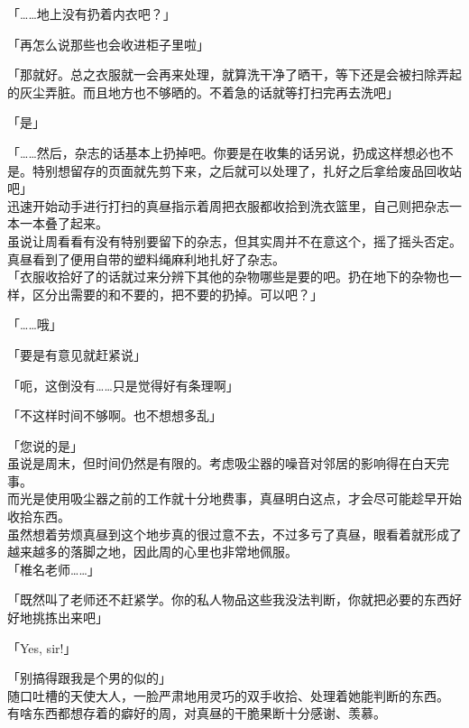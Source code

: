 「……地上没有扔着内衣吧？」

「再怎么说那些也会收进柜子里啦」

「那就好。总之衣服就一会再来处理，就算洗干净了晒干，等下还是会被扫除弄起的灰尘弄脏。而且地方也不够晒的。不着急的话就等打扫完再去洗吧」

「是」

「……然后，杂志的话基本上扔掉吧。你要是在收集的话另说，扔成这样想必也不是。特别想留存的页面就先剪下来，之后就可以处理了，扎好之后拿给废品回收站吧」\\

迅速开始动手进行打扫的真昼指示着周把衣服都收拾到洗衣篮里，自己则把杂志一本一本叠了起来。\\

虽说让周看看有没有特别要留下的杂志，但其实周并不在意这个，摇了摇头否定。真昼看到了便用自带的塑料绳麻利地扎好了杂志。\\

「衣服收拾好了的话就过来分辨下其他的杂物哪些是要的吧。扔在地下的杂物也一样，区分出需要的和不要的，把不要的扔掉。可以吧？」

「……哦」

「要是有意见就赶紧说」

「呃，这倒没有……只是觉得好有条理啊」

「不这样时间不够啊。也不想想多乱」

「您说的是」\\

虽说是周末，但时间仍然是有限的。考虑吸尘器的噪音对邻居的影响得在白天完事。\\

而光是使用吸尘器之前的工作就十分地费事，真昼明白这点，才会尽可能趁早开始收拾东西。\\

虽然想着劳烦真昼到这个地步真的很过意不去，不过多亏了真昼，眼看着就形成了越来越多的落脚之地，因此周的心里也非常地佩服。\\

「椎名老师……」

「既然叫了老师还不赶紧学。你的私人物品这些我没法判断，你就把必要的东西好好地挑拣出来吧」

「Yes, sir!」

「别搞得跟我是个男的似的」\\

随口吐槽的天使大人，一脸严肃地用灵巧的双手收拾、处理着她能判断的东西。\\

有啥东西都想存着的癖好的周，对真昼的干脆果断十分感谢、羡慕。\\


